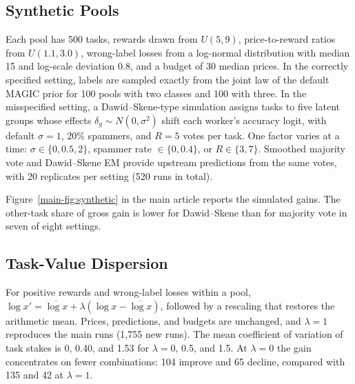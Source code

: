 \documentclass[journal]{IEEEtran}
\begin{document}
\subsection{Synthetic Pools}
Each pool has 500 tasks, rewards drawn from $U(5,9)$, price-to-reward ratios from $U(1.1,3.0)$, wrong-label losses from a log-normal distribution with median 15 and log-scale deviation 0.8, and a budget of 30 median prices. In the correctly specified setting, labels are sampled exactly from the joint law of the default MAGIC prior for 100 pools with two classes and 100 with three. In the misspecified setting, a Dawid--Skene-type simulation assigns tasks to five latent groups whose effects $\delta_g\sim N(0,\sigma^2)$ shift each worker's accuracy logit, with default $\sigma=1$, 20\% spammers, and $R=5$ votes per task. One factor varies at a time: $\sigma\in\{0,0.5,2\}$, spammer rate $\in\{0,0.4\}$, or $R\in\{3,7\}$. Smoothed majority vote and Dawid--Skene EM provide upstream predictions from the same votes, with 20 replicates per setting (520 runs in total).



Figure~\ref{main-fig:synthetic} in the main article reports the simulated gains. The other-task share of gross gain is lower for Dawid--Skene than for majority vote in seven of eight settings.

\subsection{Task-Value Dispersion}
For positive rewards and wrong-label losses within a pool, $\log x'=\overline{\log x}+\lambda(\log x-\overline{\log x})$, followed by a rescaling that restores the arithmetic mean. Prices, predictions, and budgets are unchanged, and $\lambda=1$ reproduces the main runs (1,755 new runs). The mean coefficient of variation of task stakes is 0, 0.40, and 1.53 for $\lambda=0$, 0.5, and 1.5. At $\lambda=0$ the gain concentrates on fewer combinations: 104 improve and 65 decline, compared with 135 and 42 at $\lambda=1$.
\end{document}
